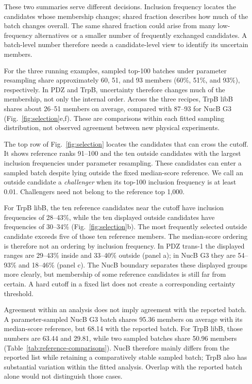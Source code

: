 \documentclass[11pt]{article}
\begin{document}
These two summaries serve different decisions. Inclusion frequency
locates the candidates whose membership changes; shared fraction
describes how much of the batch changes overall. The same shared
fraction could arise from many low-frequency alternatives or a
smaller number of frequently exchanged candidates. A batch-level
number therefore needs a candidate-level view to identify its
uncertain members.

For the three running examples, sampled top-100 batches under
parameter resampling share approximately 60, 51, and 93 members
(60\%, 51\%, and 93\%), respectively. In PDZ and TrpB, uncertainty
therefore changes much of the membership, not only the internal order.
Across the three recipes, TrpB libB shares about 26--51 members on
average, compared with
87--93 for NucB G3 (Fig.~\ref{fig:selection}e,f). These are comparisons
within each fitted sampling distribution, not observed agreement
between new physical experiments.

The top row of Fig.~\ref{fig:selection} locates the candidates that
can cross the cutoff. It shows reference ranks 91--100 and the ten
outside candidates with the largest inclusion frequencies under
parameter resampling. These candidates can enter a sampled batch
despite lying outside the fixed median-score reference. We call an
outside candidate a \emph{challenger} when its top-100 inclusion
frequency is at least 0.01. Challengers need not belong to the
reference top 1,000.

For TrpB libB, the ten reference candidates near the cutoff have
inclusion frequencies of 28--43\%, while the ten displayed outside
candidates have frequencies of 30--34\% (Fig.~\ref{fig:selection}b).
The most frequently selected outside candidate exceeds five of those
ten reference members. The median-score ordering is therefore not
an ordering by inclusion frequency. In PDZ trans-1 the displayed ranges
are 29--43\% inside and 33--40\% outside (panel a); in NucB G3 they
are 54--93\% and 18--46\% (panel c). The NucB boundary separates
these displayed groups more clearly, but membership of some reference
candidates is still far from certain. A hard cutoff in a fixed list
does not create a corresponding certainty threshold.

Agreement within an analysis does not imply agreement with the
reported batch. A parameter-sampled NucB G3 batch shares 95.36
members on average with its median-score reference, but 68.14
with the reported batch. For TrpB libB, those numbers are 63.44
and 29.81, while two sampled batches share 50.96 members
(Table~\ref{tab:reference-comparisons}). NucB therefore mainly differs
from the reported list while retaining a comparatively stable sampled
batch; TrpB also has substantial variation within the fitted analysis.
Overlap with the reported batch alone would not distinguish those cases.
\end{document}
